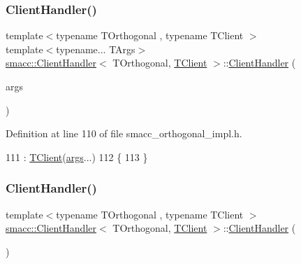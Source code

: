 \subsubsection{\texorpdfstring{Client\+Handler()}{ClientHandler()}\hspace{0.1cm}{\footnotesize\ttfamily [1/2]}}
{\footnotesize\ttfamily template$<$typename T\+Orthogonal , typename T\+Client $>$ \\
template$<$typename... T\+Args$>$ \\
\hyperlink{classsmacc_1_1ClientHandler}{smacc\+::\+Client\+Handler}$<$ T\+Orthogonal, \hyperlink{classTClient}{T\+Client} $>$\+::\hyperlink{classsmacc_1_1ClientHandler}{Client\+Handler} (\begin{DoxyParamCaption}\item[{T\+Args...}]{args }\end{DoxyParamCaption})\hspace{0.3cm}{\ttfamily [inline]}}



Definition at line 110 of file smacc\+\_\+orthogonal\+\_\+impl.\+h.


\begin{DoxyCode}
111         : \hyperlink{classTClient}{TClient}(\hyperlink{namespacegenerate__debs_a75f9143e38df82d83b2e8a6f99cae02c}{args}...)
112     \{
113     \}
\end{DoxyCode}
\mbox{\label{classsmacc_1_1ClientHandler_a73f354900b489edacad7ccb411c272da}} 
\subsubsection{\texorpdfstring{Client\+Handler()}{ClientHandler()}\hspace{0.1cm}{\footnotesize\ttfamily [2/2]}}
{\footnotesize\ttfamily template$<$typename T\+Orthogonal , typename T\+Client $>$ \\
\hyperlink{classsmacc_1_1ClientHandler}{smacc\+::\+Client\+Handler}$<$ T\+Orthogonal, \hyperlink{classTClient}{T\+Client} $>$\+::\hyperlink{classsmacc_1_1ClientHandler}{Client\+Handler} (\begin{DoxyParamCaption}{ }\end{DoxyParamCaption})\hspace{0.3cm}{\ttfamily [inline]}}



